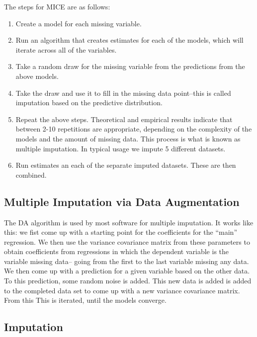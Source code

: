 \documentclass[12 pt]{article}
\begin{document}
The steps for MICE are as follows:

\begin{enumerate}
\item Create a model for each missing variable.


\item Run an algorithm that creates estimates for each of the models,
  which will iterate across all of the variables.


\item Take a random draw for the missing variable from the predictions
  from the above models. 


\item Take the draw and use it to fill in the missing data point--this
  is called imputation based on the predictive distribution.


\item Repeat the above steps. Theoretical and empirical results
  indicate that between 2-10 repetitions are appropriate, depending on
  the complexity of the models and the amount of missing data. This
  process is what is known as multiple imputation. In typical usage we
  impute 5 different datasets. 


\item Run estimates an each of the separate imputed datasets. These
  are then combined. 
\end{enumerate}

\subsection{Multiple Imputation via Data Augmentation}
\label{sec:mutl-imput-via}


The DA algorithm is used by most software for multiple imputation. It
works like this: we fist come up with a starting point for the
coefficients for the ``main'' regression. We then use the variance
covariance matrix from these parameters to obtain coefficients from
regressions in which the dependent variable is the variable missing
data-- going from the first to the last variable missing any data. We
then come up with a prediction for a given variable based on the other
data. To this prediction, some random noise is added.  This new data
is added is added to the completed data set to come up with a new
variance covariance matrix. From this  This is iterated, until the models converge. 

\subsection{Imputation}
\end{document}
